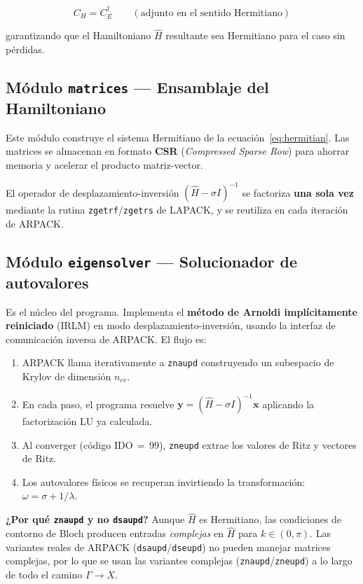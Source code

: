 \documentclass[12pt,a4paper]{article}
\begin{document}
\begin{equation}
    C_H = C_E^\dagger \qquad (\text{adjunto en el sentido Hermitiano})
\end{equation}

garantizando que el Hamiltoniano $\hat{H}$ resultante sea Hermitiano para el caso sin pérdidas.

\subsection{Módulo \texttt{matrices} — Ensamblaje del Hamiltoniano}

Este módulo construye el sistema Hermitiano de la ecuación~\eqref{eq:hermitian}. Las matrices se almacenan en formato \textbf{CSR} (\textit{Compressed Sparse Row}) para ahorrar memoria y acelerar el producto matriz-vector.

El operador de desplazamiento-inversión $(\hat{H} - \sigma I)^{-1}$ se factoriza \textbf{una sola vez} mediante la rutina \texttt{zgetrf}/\texttt{zgetrs} de LAPACK, y se reutiliza en cada iteración de ARPACK.

\subsection{Módulo \texttt{eigensolver} — Solucionador de autovalores}

Es el núcleo del programa. Implementa el \textbf{método de Arnoldi implícitamente reiniciado} (IRLM) en modo desplazamiento-inversión, usando la interfaz de comunicación inversa de ARPACK. El flujo es:

\begin{enumerate}
    \item ARPACK llama iterativamente a \texttt{znaupd} construyendo un subespacio de Krylov de dimensión $n_{cv}$.
    \item En cada paso, el programa resuelve $\mathbf{y} = (\hat{H} - \sigma I)^{-1}\mathbf{x}$ aplicando la factorización LU ya calculada.
    \item Al converger (código IDO\,$=$\,99), \texttt{zneupd} extrae los valores de Ritz y vectores de Ritz.
    \item Los autovalores físicos se recuperan invirtiendo la transformación: $\omega = \sigma + 1/\lambda$.
\end{enumerate}

\begin{warningbox}
    \textbf{¿Por qué \texttt{znaupd} y no \texttt{dsaupd}?} Aunque $\hat{H}$ es Hermitiano, las condiciones de contorno de Bloch producen entradas \textit{complejas} en $\hat{H}$ para $k\in(0,\pi)$. Las variantes reales de ARPACK (\texttt{dsaupd}/\texttt{dseupd}) no pueden manejar matrices complejas, por lo que se usan las variantes complejas (\texttt{znaupd}/\texttt{zneupd}) a lo largo de todo el camino $\Gamma\to X$.
\end{warningbox}
\end{document}
